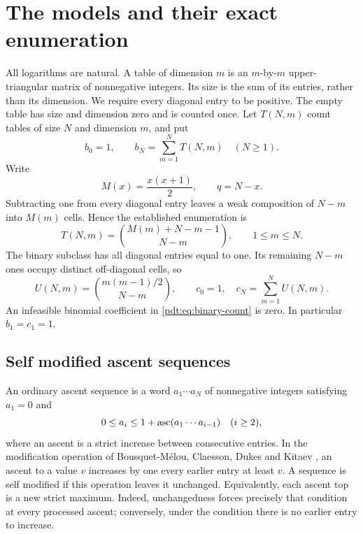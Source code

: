 \section{The models and their exact enumeration}
\label{pdt:sec:models}
All logarithms are natural. A table of dimension $m$ is an $m$-by-$m$ upper-triangular matrix of nonnegative integers. Its size is the sum of its entries, rather than its dimension. We require every diagonal entry to be positive. The empty table has size and dimension zero and is counted once. Let $T(N,m)$ count tables of size $N$ and dimension $m$, and put
\begin{equation}\label{pdt:eq:counts}
 b_0=1,\qquad b_N=\sum_{m=1}^N T(N,m)\quad(N\ge1).
\end{equation}
Write
\begin{equation}\label{pdt:eq:Mq}
 M(x)=\frac{x(x+1)}2,\qquad q=N-x.
\end{equation}
Subtracting one from every diagonal entry leaves a weak composition of $N-m$ into $M(m)$ cells. Hence the established enumeration is
\begin{equation}\label{pdt:eq:T}
 T(N,m)=\binom{M(m)+N-m-1}{N-m},\qquad 1\le m\le N.
\end{equation}
The binary subclass has all diagonal entries equal to one. Its remaining $N-m$ ones occupy distinct off-diagonal cells, so
\begin{equation}\label{pdt:eq:binary-count}
 U(N,m)=\binom{m(m-1)/2}{N-m},\qquad
 c_0=1,\quad c_N=\sum_{m=1}^N U(N,m).
\end{equation}
An infeasible binomial coefficient in \eqref{pdt:eq:binary-count} is zero. In particular $b_1=c_1=1$.

\subsection{Self modified ascent sequences}
An ordinary ascent sequence is a word $a_1\cdots a_N$ of nonnegative integers satisfying $a_1=0$ and
\[
 0\le a_i\le1+\operatorname{asc}(a_1\cdots a_{i-1})\quad(i\ge2),
\]
where an ascent is a strict increase between consecutive entries. In the modification operation of Bousquet-M\'elou, Claesson, Dukes and Kitaev \cite{bcdk}, an ascent to a value $v$ increases by one every earlier entry at least $v$. A sequence is self modified if this operation leaves it unchanged. Equivalently, each ascent top is a new strict maximum. Indeed, unchangedness forces precisely that condition at every processed ascent; conversely, under the condition there is no earlier entry to increase.

